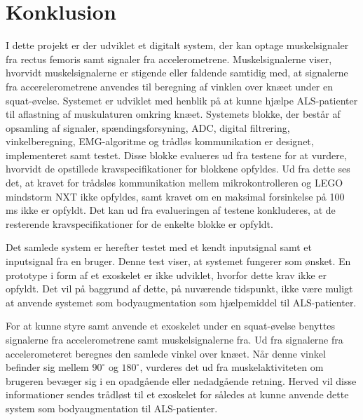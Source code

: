 \section{Konklusion}

I dette projekt er der udviklet et digitalt system, der kan optage muskelsignaler fra rectus femoris samt signaler fra accelerometrene. Muskelsignalerne viser, hvorvidt muskelsignalerne er stigende eller faldende samtidig med, at signalerne fra accerelerometrene anvendes til beregning af vinklen over knæet under en squat-øvelse. Systemet er udviklet med henblik på at kunne hjælpe ALS-patienter til aflastning af muskulaturen omkring knæet. Systemets blokke, der består af opsamling af signaler, spændingsforsyning, ADC, digital filtrering, vinkelberegning, EMG-algoritme og trådløs kommunikation er designet, implementeret samt testet. Disse blokke evalueres ud fra testene for at vurdere, hvorvidt de opstillede kravspecifikationer for blokkene opfyldes. Ud fra dette ses det, at kravet for trådsløs kommunikation mellem mikrokontrolleren og LEGO mindstorm NXT ikke opfyldes, samt kravet om en maksimal forsinkelse på 100 ms ikke er opfyldt. Det kan ud fra evalueringen af testene konkluderes, at de resterende kravspecifikationer for de enkelte blokke er opfyldt. 

Det samlede system er herefter testet med et kendt inputsignal samt et inputsignal fra en bruger. Denne test viser, at systemet fungerer som ønsket. En prototype i form af et exoskelet er ikke udviklet, hvorfor dette krav ikke er opfyldt. Det vil på baggrund af dette, på nuværende tidspunkt, ikke være muligt at anvende systemet som bodyaugmentation som hjælpemiddel til ALS-patienter. 

For at kunne styre samt anvende et exoskelet under en squat-øvelse benyttes signalerne fra accelerometrene samt muskelsignalerne fra. Ud fra signalerne fra accelerometeret beregnes den samlede vinkel over knæet. Når denne vinkel befinder sig mellem  $90^{\circ}$ og $180^{\circ}$, vurderes det ud fra muskelaktiviteten om brugeren bevæger sig i en opadgående eller nedadgående retning. Herved vil disse informationer sendes trådløst til et exoskelet for således at kunne anvende dette system som bodyaugmentation til ALS-patienter.